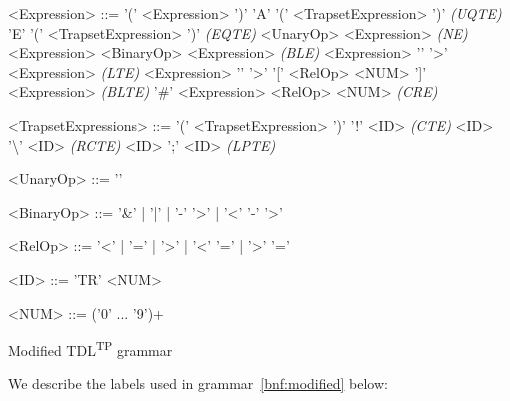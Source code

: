 \documentclass[12pt,oneside,a4paper,notitlepage]{report}
\newcommand{\texttilde}{\raisebox{0.5ex}{\texttildelow}}
\begin{document}
	\begin{GrammarWrapper}
		\begin{grammar}
			<Expression>	::=	'(' <Expression> ')'
			\alt 				'A' '(' <TrapsetExpression> ')' \textit{(UQTE)}
			\alt 				'E' '(' <TrapsetExpression> ')' \textit{(EQTE)}
			\alt 				<UnaryOp> <Expression> \textit{(NE)}
			\alt 				<Expression> <BinaryOp> <Expression> \textit{(BLE)}
			\alt 				<Expression> '\texttilde' '\textgreater' <Expression> \textit{(LTE)}
			\alt 				<Expression> '\texttilde' '\textgreater' '[' <RelOp> <NUM> ']' <Expression> \textit{(BLTE)}
			\alt 				'\#' <Expression> <RelOp> <NUM> \textit{(CRE)}
	
			<TrapsetExpressions>	::=	'(' <TrapsetExpression> ')'
			\alt						'!' <ID> \textit{(CTE)}
			\alt 						<ID> '\textbackslash' <ID> \textit{(RCTE)}
			\alt						<ID> ';' <ID> \textit{(LPTE)}
	
			<UnaryOp>	::= '\texttilde'
	
			<BinaryOp>	::= '\&' | '|' | '-' '\textgreater' | '\textless' '-' '\textgreater'
	
			<RelOp> 	::= '\textless' | '=' | '\textgreater' | '\textless' '=' | '\textgreater' '='
	
			<ID> 		::= 'TR' <NUM>
	
			<NUM> 		::= ('0' ... '9')+
		\end{grammar}
		\caption{Modified TDL\textsuperscript{TP} grammar}\label{bnf:modified}
	\end{GrammarWrapper}

	\newpage

	\par We describe the labels used in grammar~\ref{bnf:modified} below: %
\end{document}
